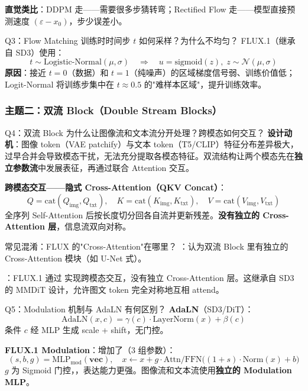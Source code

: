 \begin{intubox}
\textbf{直觉类比}：DDPM 走——需要很多步猜转弯；Rectified Flow 走——模型直接预测速度 $(\varepsilon - x_0)$，步少误差小。
\end{intubox}

\begin{conceptbox}{Q3：Flow Matching 训练时时间步 $t$ 如何采样？为什么不均匀？}
FLUX.1（继承自 SD3）使用：
\[
t \sim \text{Logistic-Normal}(\mu, \sigma) \quad \Longrightarrow \quad u = \text{sigmoid}(z),\; z \sim \mathcal{N}(\mu,\sigma)
\]
\textbf{原因}：接近 $t=0$（数据）和 $t=1$（纯噪声）的区域梯度信号弱、训练价值低；Logit-Normal 将训练步集中在 $t \approx 0.5$ 的"难样本区域"，提升训练效率。

\end{conceptbox}

\subsubsection{主题二：双流 Block（Double Stream Blocks）}

\begin{conceptbox}{Q4：双流 Block 为什么让图像流和文本流分开处理？跨模态如何交互？}
\textbf{设计动机}：图像 token（VAE patchify）与文本 token（T5/CLIP）特征分布差异极大，过早合并会导致模态干扰，无法充分提取各模态特征。双流结构让两个模态先在\textbf{独立参数流}中发展表征，再通过联合 Attention 交互。

\textbf{跨模态交互——隐式 Cross-Attention（QKV Concat）}：
\[
Q = \text{cat}(Q_\text{img}, Q_\text{txt}),\quad K = \text{cat}(K_\text{img}, K_\text{txt}),\quad V = \text{cat}(V_\text{img}, V_\text{txt})
\]
全序列 Self-Attention 后按长度切分回各自流并更新残差。\textbf{没有独立的 Cross-Attention 层}，信息流双向对称。
\end{conceptbox}

\begin{warnbox}{常见混淆：FLUX 的"Cross-Attention"在哪里？}
：认为双流 Block 里有独立的 Cross-Attention 模块（如 U-Net 式）。

：FLUX.1 通过 实现跨模态交互，没有独立 Cross-Attention 层。这继承自 SD3 的 MMDiT 设计，允许图文 token 完全对称地互相 attend。
\end{warnbox}

\begin{conceptbox}{Q5：Modulation 机制与 AdaLN 有何区别？}
\textbf{AdaLN}（SD3/DiT）：
\[
\text{AdaLN}(x, c) = \gamma(c) \cdot \text{LayerNorm}(x) + \beta(c)
\]
条件 $c$ 经 MLP 生成 scale + shift，无门控。

\textbf{FLUX.1 Modulation}：增加了（3 组参数）：
\[
(s, b, g) = \text{MLP}_\text{mod}(\mathbf{vec}), \quad x \leftarrow x + g \cdot \text{Attn/FFN}\bigl((1+s)\cdot\text{Norm}(x) + b\bigr)
\]
$g$ 为 Sigmoid 门控，，表达能力更强。图像流和文本流使用\textbf{独立的 Modulation MLP}。
\end{conceptbox}

